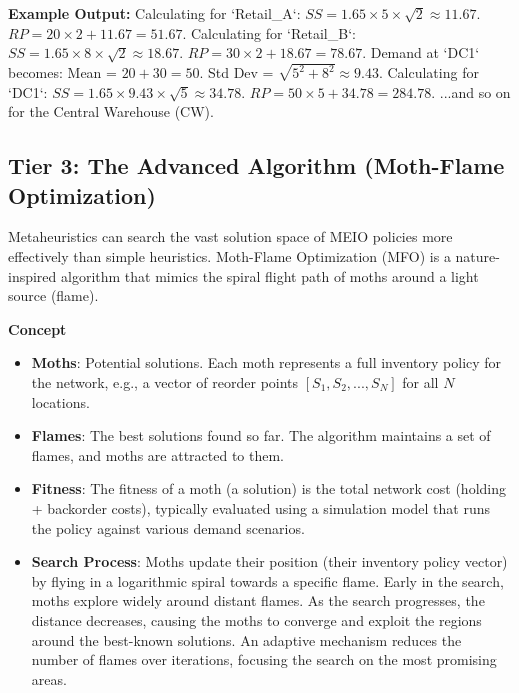 \documentclass{article}
\begin{document}


\textbf{Example Output:}
Calculating for `Retail_A`: $SS = 1.65 \times 5 \times \sqrt{2} \approx 11.67$. $RP = 20 \times 2 + 11.67 = 51.67$.
Calculating for `Retail_B`: $SS = 1.65 \times 8 \times \sqrt{2} \approx 18.67$. $RP = 30 \times 2 + 18.67 = 78.67$.
Demand at `DC1` becomes: Mean = $20+30=50$. Std Dev = $\sqrt{5^2 + 8^2} \approx 9.43$.
Calculating for `DC1`: $SS = 1.65 \times 9.43 \times \sqrt{5} \approx 34.78$. $RP = 50 \times 5 + 34.78 = 284.78$.
...and so on for the Central Warehouse (CW).


\subsection{Tier 3: The Advanced Algorithm (Moth-Flame Optimization)}

Metaheuristics can search the vast solution space of MEIO policies more effectively than simple heuristics. Moth-Flame Optimization (MFO) is a nature-inspired algorithm that mimics the spiral flight path of moths around a light source (flame).

\textbf{Concept}
\begin{itemize}
    \item \textbf{Moths}: Potential solutions. Each moth represents a full inventory policy for the network, e.g., a vector of reorder points $[S_1, S_2, ..., S_N]$ for all $N$ locations.
    \item \textbf{Flames}: The best solutions found so far. The algorithm maintains a set of flames, and moths are attracted to them.
    \item \textbf{Fitness}: The fitness of a moth (a solution) is the total network cost (holding + backorder costs), typically evaluated using a simulation model that runs the policy against various demand scenarios.
    \item \textbf{Search Process}: Moths update their position (their inventory policy vector) by flying in a logarithmic spiral towards a specific flame. Early in the search, moths explore widely around distant flames. As the search progresses, the distance decreases, causing the moths to converge and exploit the regions around the best-known solutions. An adaptive mechanism reduces the number of flames over iterations, focusing the search on the most promising areas.
\end{itemize}
\end{document}
